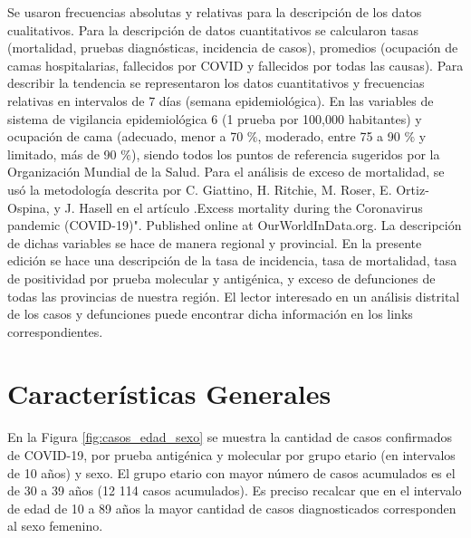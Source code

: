 \documentclass[12pt,a4paper,openany]{book}
\begin{document}
	

	Se usaron frecuencias absolutas y relativas para la descripción de los datos cualitativos. Para la
	descripción de datos cuantitativos se calcularon tasas (mortalidad, pruebas diagnósticas, incidencia de
	casos), promedios (ocupación de camas hospitalarias, fallecidos por COVID y fallecidos por todas las
	causas). Para describir la tendencia se representaron los datos cuantitativos y frecuencias relativas en
	intervalos de 7 días (semana epidemiológica). En las variables de sistema de vigilancia epidemiológica
	6
	(1 prueba por 100,000 habitantes) y ocupación de cama (adecuado, menor a 70 $\%$, moderado,
	entre 75 a 90  $\%$ y limitado, más de 90 $\%$), siendo todos los puntos de referencia sugeridos por la
	Organización Mundial de la Salud. Para el análisis de exceso de mortalidad, se usó la metodología
	descrita por C. Giattino, H. Ritchie, M. Roser, E. Ortiz-Ospina, y J. Hasell en el artículo .Excess
	mortality during the Coronavirus pandemic (COVID-19)". Published online at OurWorldInData.org.
	La descripción de dichas variables se hace de manera regional y provincial. En la presente edición
	se hace una descripción de la tasa de incidencia, tasa de mortalidad, tasa de positividad por prueba
	molecular y antigénica, y exceso de defunciones de todas las provincias de nuestra región. El lector
	interesado en un análisis distrital de los casos y defunciones puede encontrar dicha información en
	los links correspondientes.
	
	
	\clearpage	
	\section*{Características Generales}
	
	
	
	\noindent En la Figura \ref{fig:casos_edad_sexo} se muestra la cantidad de casos confirmados de COVID-19, por prueba antigénica y molecular por grupo etario (en intervalos de 10 años) y sexo. El grupo etario con mayor número de casos acumulados es el de 30 a 39 años (12 114 casos acumulados). 	Es preciso recalcar que en el intervalo de edad de 10 a 89 años la mayor cantidad de casos diagnosticados corresponden al sexo femenino.  
	
\end{document}
